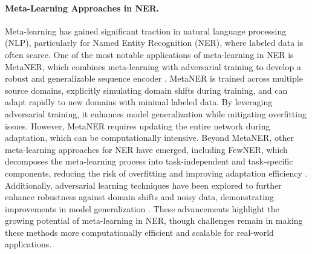 \paragraph{Meta-Learning Approaches in NER.}  
Meta-learning has gained significant traction in natural language processing (NLP), particularly for Named Entity Recognition (NER), where labeled data is often scarce. One of the most notable applications of meta-learning in NER is MetaNER, which combines meta-learning with adversarial training to develop a robust and generalizable sequence encoder \cite{li2020metaner}. MetaNER is trained across multiple source domains, explicitly simulating domain shifts during training, and can adapt rapidly to new domains with minimal labeled data. By leveraging adversarial training, it enhances model generalization while mitigating overfitting issues. However, MetaNER requires updating the entire network during adaptation, which can be computationally intensive.
Beyond MetaNER, other meta-learning approaches for NER have emerged, including FewNER, which decomposes the meta-learning process into task-independent and task-specific components, reducing the risk of overfitting and improving adaptation efficiency \cite{Li2023Few-Shot}. Additionally, adversarial learning techniques have been explored to further enhance robustness against domain shifts and noisy data, demonstrating improvements in model generalization \cite{Fu2021Exploiting}. These advancements highlight the growing potential of meta-learning in NER, though challenges remain in making these methods more computationally efficient and scalable for real-world applications.

